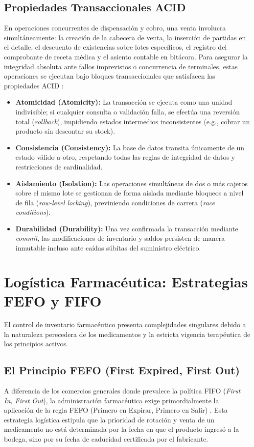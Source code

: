 \subsection{Propiedades Transaccionales ACID}
En operaciones concurrentes de dispensación y cobro, una venta involucra simultáneamente: la creación de la cabecera de venta, la inserción de partidas en el detalle, el descuento de existencias sobre lotes específicos, el registro del comprobante de receta médica y el asiento contable en bitácora. Para asegurar la integridad absoluta ante fallos imprevistos o concurrencia de terminales, estas operaciones se ejecutan bajo bloques transaccionales que satisfacen las propiedades ACID \cite{elmasri2016}:
\begin{itemize}
    \item \textbf{Atomicidad (Atomicity):} La transacción se ejecuta como una unidad indivisible; si cualquier consulta o validación falla, se efectúa una reversión total (\textit{rollback}), impidiendo estados intermedios inconsistentes (e.g., cobrar un producto sin descontar su stock).
    \item \textbf{Consistencia (Consistency):} La base de datos transita únicamente de un estado válido a otro, respetando todas las reglas de integridad de datos y restricciones de cardinalidad.
    \item \textbf{Aislamiento (Isolation):} Las operaciones simultáneas de dos o más cajeros sobre el mismo lote se gestionan de forma aislada mediante bloqueos a nivel de fila (\textit{row-level locking}), previniendo condiciones de carrera (\textit{race conditions}).
    \item \textbf{Durabilidad (Durability):} Una vez confirmada la transacción mediante \textit{commit}, las modificaciones de inventario y saldos persisten de manera inmutable incluso ante caídas súbitas del suministro eléctrico.
\end{itemize}

\section{Logística Farmacéutica: Estrategias FEFO y FIFO}

El control de inventario farmacéutico presenta complejidades singulares debido a la naturaleza perecedera de los medicamentos y la estricta vigencia terapéutica de los principios activos.

\subsection{El Principio FEFO (First Expired, First Out)}
A diferencia de los comercios generales donde prevalece la política FIFO (\textit{First In, First Out}), la administración farmacéutica exige primordialmente la aplicación de la regla FEFO (Primero en Expirar, Primero en Salir) \cite{cofepris2020}. Esta estrategia logística estipula que la prioridad de rotación y venta de un medicamento no está determinada por la fecha en que el producto ingresó a la bodega, sino por su fecha de caducidad certificada por el fabricante.

